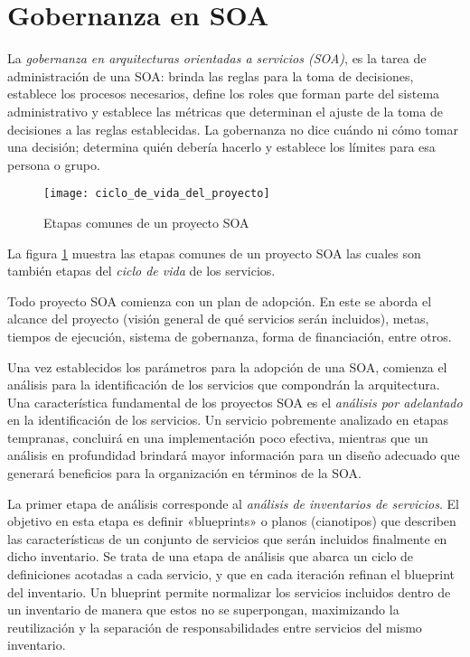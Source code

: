\section{Gobernanza en SOA}
  \label{MarcoConceptual:GobernanzaSOA}

  La \emph{gobernanza en arquitecturas orientadas a servicios (SOA)}, es la tarea de administración de una SOA: brinda las reglas para la toma de decisiones, establece los procesos necesarios, define los roles que forman parte del sistema administrativo y establece las métricas que determinan el ajuste de la toma de decisiones a las reglas establecidas. La gobernanza no dice cuándo ni cómo tomar una decisión; determina quién debería hacerlo y establece los límites para esa persona o grupo. \cite{Erl:2011:SGG:1983453}

  \begin{figure}[h]
    \centering
    \texttt{[image: ciclo\_de\_vida\_del\_proyecto]}
    \caption{Etapas comunes de un proyecto SOA}
    \label{figura:ciclo_de_vida_del_proyecto}
  \end{figure}

  La figura \ref{figura:ciclo_de_vida_del_proyecto} muestra las etapas comunes de un proyecto SOA las cuales son también etapas del \emph{ciclo de vida} de los servicios.

  Todo proyecto SOA comienza con un plan de adopción. En este se aborda el alcance del proyecto (visión general de qué servicios serán incluidos), metas, tiempos de ejecución, sistema de gobernanza, forma de financiación, entre otros.

  Una vez establecidos los parámetros para la adopción de una SOA, comienza el análisis para la identificación de los servicios que compondrán la arquitectura. Una característica fundamental de los proyectos SOA es el \emph{análisis por adelantado} en la identificación de los servicios. Un servicio pobremente analizado en etapas tempranas, concluirá en una implementación poco efectiva, mientras que un análisis en profundidad brindará mayor información para un diseño adecuado que generará beneficios para la organización en términos de la SOA.

  La primer etapa de análisis corresponde al \emph{análisis de inventarios de servicios}. El objetivo en esta etapa es definir «blueprints» o planos (cianotipos) que describen las características de un conjunto de servicios que serán incluidos finalmente en dicho inventario. Se trata de una etapa de análisis que abarca un ciclo de definiciones acotadas a cada servicio, y que en cada iteración refinan el blueprint del inventario. Un blueprint permite normalizar los servicios incluidos dentro de un inventario de manera que estos no se superpongan, maximizando la reutilización y la separación de responsabilidades entre servicios del mismo inventario. \cite{Erl:2011:SGG:1983453}

